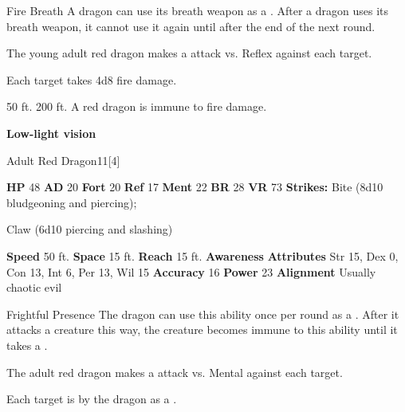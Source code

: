     \begin{freeability}{Fire Breath}
      A dragon can use its breath weapon as a .
      After a dragon uses its breath weapon, it cannot use it again until after the end of the next round.
      \par The young adult red dragon makes a  attack
        vs. Reflex against each target.
    
    \hit Each target takes 4d8 fire damage.
    \end{freeability}
  
      
       50 ft.
     200 ft.
     A red dragon is immune to fire damage.
    \par\noindent\textbf{Low-light vision}
  

  \begin{monsubsection}{Adult Red Dragon}{11}[4]
    \vspace{-1em}\vspace{-1em}
    \vspace{0em}

    
    

    \begin{spellcontent}
      \begin{spelltargetinginfo}
        \pari \textbf{HP} 48 \monsep
          \textbf{AD} 20 \monsep
          \textbf{Fort} 20 \monsep
          \textbf{Ref} 17 \monsep
          \textbf{Ment} 22
        \pari \textbf{BR} 28 \monsep
        \textbf{VR} 73
        \pari \textbf{Strikes:}
            Bite  (8d10 bludgeoning and piercing);
\par Claw  (6d10 piercing and slashing)
      \end{spelltargetinginfo}
    \end{spellcontent}
    \begin{monsterfooter}
      \pari \textbf{Speed} 50 ft. \monsep
        \textbf{Space} 15 ft. \monsep
        \textbf{Reach} 15 ft.
      \pari \textbf{Awareness} 
      \pari \textbf{Attributes}
        Str 15, Dex 0,
        Con 13, Int 6,
        Per 13, Wil 15
      \pari \textbf{Accuracy} 16 \monsep
        \textbf{Power} 23
      \pari \textbf{Alignment} Usually chaotic evil
    \end{monsterfooter}
  \end{monsubsection}
  \begin{freeability}{Frightful Presence}
      The dragon can use this ability once per round as a .
      After it attacks a creature this way, the creature becomes immune to this ability until it takes a .
      \par The adult red dragon makes a  attack
        vs. Mental against each target.
    
    \hit Each target is  by the dragon as a .
    \end{freeability}
  

